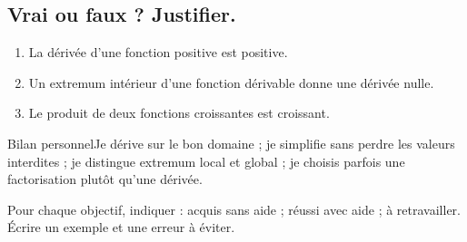 \subsection*{Vrai ou faux ? Justifier.}\label{C06-VF}
\begin{enumerate}
\item La dérivée d’une fonction positive est positive.
\item Un extremum intérieur d’une fonction dérivable donne une dérivée nulle.
\item Le produit de deux fonctions croissantes est croissant.
\end{enumerate}
\begin{repere}{Bilan personnel}Je dérive sur le bon domaine ; je simplifie sans perdre les valeurs interdites ; je distingue extremum local et global ; je choisis parfois une factorisation plutôt qu’une dérivée.

Pour chaque objectif, indiquer : acquis sans aide ; réussi avec aide ; à retravailler. Écrire un exemple et une erreur à éviter.\end{repere}
\endgroup
\ifprof\fi
